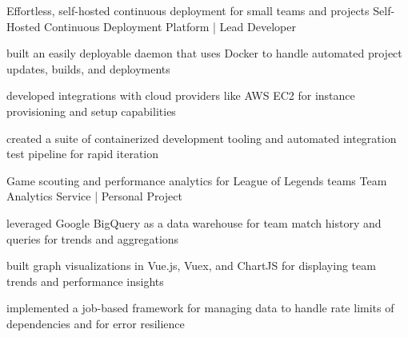  
\begin{cventries}

  \cventry
    {Effortless, self-hosted continuous deployment for small teams and projects} %
    {Self-Hosted Continuous Deployment Platform | Lead Developer} %
    {} %
    {} %
    {
      \begin{cvitems} %
        \item {built an easily deployable daemon that uses Docker to handle automated project updates, builds, and deployments}
        \item {developed integrations with cloud providers like AWS EC2 for instance provisioning and setup capabilities}
        \item{created a suite of containerized development tooling and automated integration test pipeline for rapid iteration}
      \end{cvitems}
    }

  \cventry
    {Game scouting and performance analytics for League of Legends teams} %
    {Team Analytics Service | Personal Project} %
    {} %
    {} %
    {
      \begin{cvitems} %
        \item {leveraged Google BigQuery as a data warehouse for team match history and queries for trends and aggregations}
        \item {built graph visualizations in Vue.js, Vuex, and ChartJS for displaying team trends and performance insights}
        \item {implemented a job-based framework for managing data to handle rate limits of dependencies and for error resilience}
      \end{cvitems}
    }


\end{cventries}
